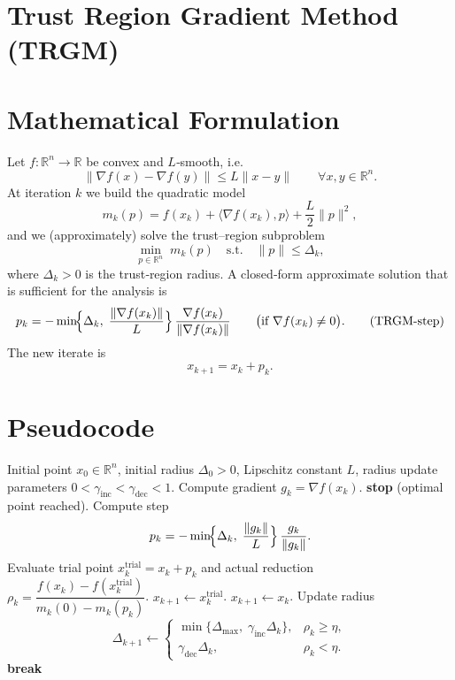 \documentclass{article}
\begin{document}
\section*{Trust Region Gradient Method (TRGM)}

\section*{Mathematical Formulation}
Let $f:\mathbb{R}^n\rightarrow\mathbb{R}$ be convex and $L$‑smooth, i.e.
\[
\|\nabla f(x)-\nabla f(y)\|\le L\|x-y\|\qquad\forall x,y\in\mathbb{R}^n .
\]
At iteration $k$ we build the quadratic model
\[
m_k(p)=f(x_k)+\langle\nabla f(x_k),p\rangle+\frac{L}{2}\|p\|^2 ,
\]
and we (approximately) solve the trust–region subproblem
\begin{equation}
\label{eq:subprob}
\min_{p\in\mathbb{R}^n}\; m_k(p)\quad\text{s.t.}\quad \|p\|\le \Delta_k ,
\end{equation}
where $\Delta_k>0$ is the trust‑region radius.  
A closed‑form approximate solution that is sufficient for the analysis is
\[
p_k=
-\min\!\Bigl\{\Delta_k,\;\frac{\|\nabla f(x_k)\|}{L}\Bigr\}\,
\frac{\nabla f(x_k)}{\|\nabla f(x_k)\|}\qquad
\bigl(\text{if }\nabla f(x_k)\neq0\bigr) .
\tag{TRGM‑step}
\]
The new iterate is
\[
x_{k+1}=x_k+p_k .
\]

\section*{Pseudocode}
\begin{algorithm}[H]
\caption{Trust Region Gradient Method (TRGM)}\label{alg:trgm}
\begin{algorithmic}[1]
\Require Initial point $x_0\in\mathbb{R}^n$, initial radius $\Delta_0>0$, Lipschitz constant $L$, 
        radius update parameters $0<\gamma_{\text{inc}}<\gamma_{\text{dec}}<1$.
    \State Compute gradient $g_k=\nabla f(x_k)$.
        \State \textbf{stop} (optimal point reached).
    \EndIf
    \State Compute step
    \[
    p_k=-\min\!\Bigl\{\Delta_k,\;\frac{\|g_k\|}{L}\Bigr\}\,\frac{g_k}{\|g_k\|}.
    \]
    \State Evaluate trial point $x_k^{\text{trial}}=x_k+p_k$ and actual reduction
    $ \rho_k=\dfrac{f(x_k)-f(x_k^{\text{trial}})}{m_k(0)-m_k(p_k)}$.
       
        \State $x_{k+1}\gets x_k^{\text{trial}}$.
    \Else
        \State $x_{k+1}\gets x_k$.
    \EndIf
    \State Update radius
    \[
    \Delta_{k+1}\gets 
    \begin{cases}
    \min\{\Delta_{\max},\;\gamma_{\text{inc}}\Delta_k\}, & \rho_k\ge \eta,\\[4pt]
    \gamma_{\text{dec}}\Delta_k, & \rho_k<\eta .
    \end{cases}
    \]
    \State \textbf{break}\EndIf
\EndFor
\end{algorithmic}
\end{algorithm}
\end{document}
